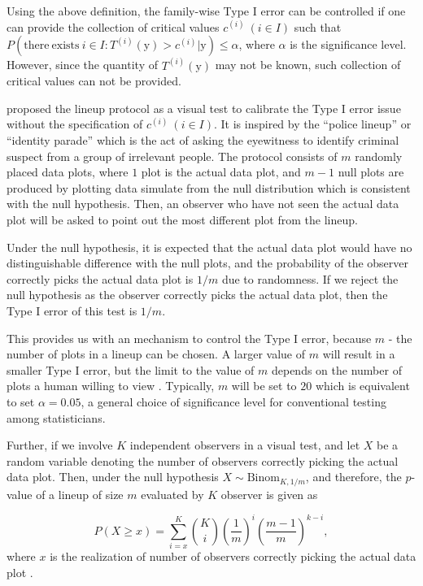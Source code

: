 \documentclass{monashthesis}
\theoremstyle{definition}
\theoremstyle{definition}
\theoremstyle{definition}
\theoremstyle{definition}
\theoremstyle{remark}
\begin{document}
Using the above definition, the family-wise Type I error can be controlled if one can provide the collection of critical values \(c^{(i)}~(i \in I)\) such that \(P(\mathrm{there~exists~} i \in I: T^{(i)}(\boldsymbol{\mathrm{y}}) > c^{(i)}|\boldsymbol{\mathrm{y}}) \leq \alpha\), where \(\alpha\) is the significance level. However, since the quantity of \(T^{(i)}(\boldsymbol{\mathrm{y}})\) may not be known, such collection of critical values can not be provided.

\textcite{buja_statistical_2009} proposed the lineup protocol as a visual test to calibrate the Type I error issue without the specification of \(c^{(i)}~(i \in I)\). It is inspired by the ``police lineup'' or ``identity parade'' which is the act of asking the eyewitness to identify criminal suspect from a group of irrelevant people. The protocol consists of \(m\) randomly placed data plots, where \(1\) plot is the actual data plot, and \(m-1\) null plots are produced by plotting data simulate from the null distribution which is consistent with the null hypothesis. Then, an observer who have not seen the actual data plot will be asked to point out the most different plot from the lineup.

Under the null hypothesis, it is expected that the actual data plot would have no distinguishable difference with the null plots, and the probability of the observer correctly picks the actual data plot is \(1/m\) due to randomness. If we reject the null hypothesis as the observer correctly picks the actual data plot, then the Type I error of this test is \(1/m\).

This provides us with an mechanism to control the Type I error, because \(m\) - the number of plots in a lineup can be chosen. A larger value of \(m\) will result in a smaller Type I error, but the limit to the value of \(m\) depends on the number of plots a human willing to view \autocite{buja_statistical_2009}. Typically, \(m\) will be set to \(20\) which is equivalent to set \(\alpha = 0.05\), a general choice of significance level for conventional testing among statisticians.

Further, if we involve \(K\) independent observers in a visual test, and let \(X\) be a random variable denoting the number of observers correctly picking the actual data plot. Then, under the null hypothesis \(X \sim \mathrm{Binom}_{K,1/m}\), and therefore, the \(p\)-value of a lineup of size \(m\) evaluated by \(K\) observer is given as

\[P(X \geq x) = \sum_{i=x}^{K}{{K}\choose{i}}\left(\frac{1}{m}\right)^i\left(\frac{m-1}{m}\right)^{k-i},\]
where \(x\) is the realization of number of observers correctly picking the actual data plot \autocite{majumder_validation_2013}.
\end{document}
